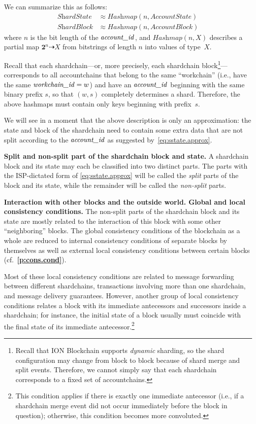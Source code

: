 \documentclass[12pt,oneside]{article}
\def\makepoint#1{\medbreak\noindent{\bf #1.\ }}
\def\nxsubpoint{\refstepcounter{subsubsection}%
  \smallbreak\makepoint{\thesubsubsection}}
\def\refpoint#1{{\rm\textbf{\ref{#1}}}}
\let\ptref=\refpoint
\def\emb#1{\textbf{#1.}}
\let\tp=\textit
\let\vr=\textit
\def\workchainid{\vr{workchain\_id\/}}
\def\accountid{\vr{account\_id\/}}
\def\Hashmap{\tp{Hashmap}}
\def\st#1{{\mathbf{#1}}}
\begin{document}
We can summarize this as follows:
\begin{align}\label{eq:sstate.approx}
  \textit{ShardState}&\approx\Hashmap(n,\textit{AccountState})\\
  \textit{ShardBlock}&\approx\Hashmap(n,\textit{AccountBlock})
\end{align}
where $n$ is the bit length of the $\accountid$, and $\Hashmap(n,X)$ describes a partial map $\st2^n\dashrightarrow X$ from bitstrings of length $n$ into values of type~$X$.

Recall that each shardchain---or, more precisely, each shardchain block\footnote{Recall that ION Blockchain supports {\em dynamic\/} sharding, so the shard configuration may change from block to block because of shard merge and split events. Therefore, we cannot simply say that each shardchain corresponds to a fixed set of accountchains.}---corresponds to all accountchains that belong to the same ``workchain'' (i.e., have the same $\workchainid=w$) and have an $\accountid$ beginning with the same binary prefix $s$, so that $(w,s)$ completely determines a shard. Therefore, the above hashmaps must contain only keys beginning with prefix~$s$.

We will see in a moment that the above description is only an approximation: the state and block of the shardchain need to contain some extra data that are not split according to the $\accountid$ as suggested by~\eqref{eq:sstate.approx}.

\nxsubpoint\label{sp:split.blk.part}\emb{Split and non-split part of the shardchain block and state}
A shardchain block and its state may each be classified into two distinct parts. The parts with the ISP-dictated form of \eqref{eq:sstate.approx} will be called the {\em split\/} parts of the block and its state, while the remainder will be called the {\em non-split\/} parts.

\nxsubpoint\label{sp:blk.inter.1}\emb{Interaction with other blocks and the outside world. Global and local consistency conditions}
The non-split parts of the shardchain block and its state are mostly related to the interaction of this block with some other ``neighboring'' blocks. The global consistency conditions of the blockchain as a whole are reduced to internal consistency conditions of separate blocks by themselves as well as external local consistency conditions between certain blocks (cf.~\ptref{p:cons.cond}).

Most of these local consistency conditions are related to message forwarding between different shardchains, transactions involving more than one shardchain, and message delivery guarantees. However, another group of local consistency conditions relates a block with its immediate antecessors and successors inside a shardchain; for instance, the initial state of a block usually must coincide with the final state of its immediate antecessor.\footnote{This condition applies if there is exactly one immediate antecessor (i.e., if a shardchain merge event did not occur immediately before the block in question); otherwise, this condition becomes more convoluted.}
\end{document}
